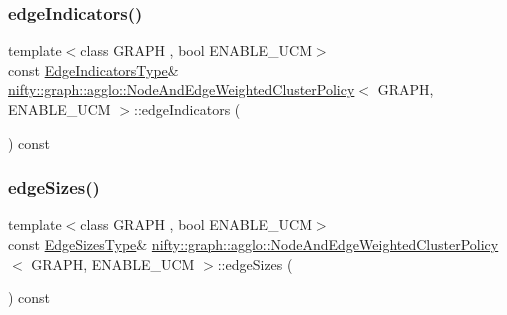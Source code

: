 \subsubsection{\texorpdfstring{edge\+Indicators()}{edgeIndicators()}}
{\footnotesize\ttfamily template$<$class G\+R\+A\+PH , bool E\+N\+A\+B\+L\+E\+\_\+\+U\+CM$>$ \\
const \hyperlink{classnifty_1_1graph_1_1agglo_1_1NodeAndEdgeWeightedClusterPolicy_a708c515ae905c01d71d590976fb06ebb}{Edge\+Indicators\+Type}\& \hyperlink{classnifty_1_1graph_1_1agglo_1_1NodeAndEdgeWeightedClusterPolicy}{nifty\+::graph\+::agglo\+::\+Node\+And\+Edge\+Weighted\+Cluster\+Policy}$<$ G\+R\+A\+PH, E\+N\+A\+B\+L\+E\+\_\+\+U\+CM $>$\+::edge\+Indicators (\begin{DoxyParamCaption}{ }\end{DoxyParamCaption}) const\hspace{0.3cm}{\ttfamily [inline]}}

\mbox{\label{classnifty_1_1graph_1_1agglo_1_1NodeAndEdgeWeightedClusterPolicy_a349c18a261caebd819e9c15648f49387}} 
\subsubsection{\texorpdfstring{edge\+Sizes()}{edgeSizes()}}
{\footnotesize\ttfamily template$<$class G\+R\+A\+PH , bool E\+N\+A\+B\+L\+E\+\_\+\+U\+CM$>$ \\
const \hyperlink{classnifty_1_1graph_1_1agglo_1_1NodeAndEdgeWeightedClusterPolicy_a3026f9b9f7061857a7d6c833c1b2fafb}{Edge\+Sizes\+Type}\& \hyperlink{classnifty_1_1graph_1_1agglo_1_1NodeAndEdgeWeightedClusterPolicy}{nifty\+::graph\+::agglo\+::\+Node\+And\+Edge\+Weighted\+Cluster\+Policy}$<$ G\+R\+A\+PH, E\+N\+A\+B\+L\+E\+\_\+\+U\+CM $>$\+::edge\+Sizes (\begin{DoxyParamCaption}{ }\end{DoxyParamCaption}) const\hspace{0.3cm}{\ttfamily [inline]}}

\mbox{\label{classnifty_1_1graph_1_1agglo_1_1NodeAndEdgeWeightedClusterPolicy_a0f5da6b06eeac28d789865bfe6450b07}} 
